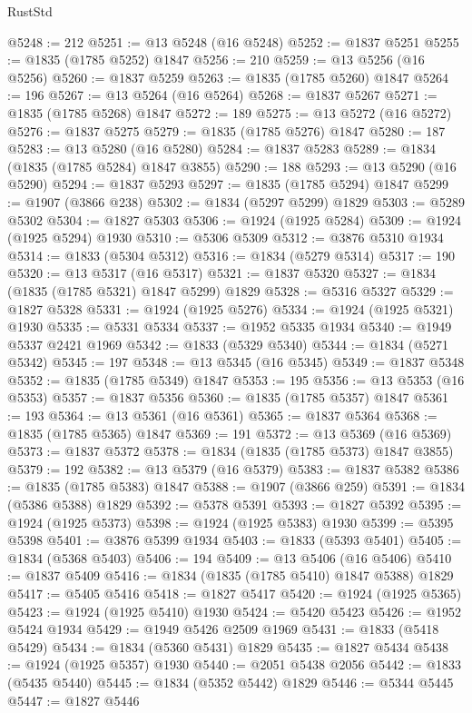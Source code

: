 \begin{lexlean}{RustStd}
\begin{coremodule}
@5248 := 212
@5251 := @13 @5248 (@16 @5248)
@5252 := @1837 @5251
@5255 := @1835 (@1785 @5252) @1847
@5256 := 210
@5259 := @13 @5256 (@16 @5256)
@5260 := @1837 @5259
@5263 := @1835 (@1785 @5260) @1847
@5264 := 196
@5267 := @13 @5264 (@16 @5264)
@5268 := @1837 @5267
@5271 := @1835 (@1785 @5268) @1847
@5272 := 189
@5275 := @13 @5272 (@16 @5272)
@5276 := @1837 @5275
@5279 := @1835 (@1785 @5276) @1847
@5280 := 187
@5283 := @13 @5280 (@16 @5280)
@5284 := @1837 @5283
@5289 := @1834 (@1835 (@1785 @5284) @1847 @3855)
@5290 := 188
@5293 := @13 @5290 (@16 @5290)
@5294 := @1837 @5293
@5297 := @1835 (@1785 @5294) @1847
@5299 := @1907 (@3866 @238)
@5302 := @1834 (@5297 @5299) @1829
@5303 := @5289 @5302
@5304 := @1827 @5303
@5306 := @1924 (@1925 @5284)
@5309 := @1924 (@1925 @5294) @1930
@5310 := @5306 @5309
@5312 := @3876 @5310 @1934
@5314 := @1833 (@5304 @5312)
@5316 := @1834 (@5279 @5314)
@5317 := 190
@5320 := @13 @5317 (@16 @5317)
@5321 := @1837 @5320
@5327 := @1834 (@1835 (@1785 @5321) @1847 @5299) @1829
@5328 := @5316 @5327
@5329 := @1827 @5328
@5331 := @1924 (@1925 @5276)
@5334 := @1924 (@1925 @5321) @1930
@5335 := @5331 @5334
@5337 := @1952 @5335 @1934
@5340 := @1949 @5337 @2421 @1969
@5342 := @1833 (@5329 @5340)
@5344 := @1834 (@5271 @5342)
@5345 := 197
@5348 := @13 @5345 (@16 @5345)
@5349 := @1837 @5348
@5352 := @1835 (@1785 @5349) @1847
@5353 := 195
@5356 := @13 @5353 (@16 @5353)
@5357 := @1837 @5356
@5360 := @1835 (@1785 @5357) @1847
@5361 := 193
@5364 := @13 @5361 (@16 @5361)
@5365 := @1837 @5364
@5368 := @1835 (@1785 @5365) @1847
@5369 := 191
@5372 := @13 @5369 (@16 @5369)
@5373 := @1837 @5372
@5378 := @1834 (@1835 (@1785 @5373) @1847 @3855)
@5379 := 192
@5382 := @13 @5379 (@16 @5379)
@5383 := @1837 @5382
@5386 := @1835 (@1785 @5383) @1847
@5388 := @1907 (@3866 @259)
@5391 := @1834 (@5386 @5388) @1829
@5392 := @5378 @5391
@5393 := @1827 @5392
@5395 := @1924 (@1925 @5373)
@5398 := @1924 (@1925 @5383) @1930
@5399 := @5395 @5398
@5401 := @3876 @5399 @1934
@5403 := @1833 (@5393 @5401)
@5405 := @1834 (@5368 @5403)
@5406 := 194
@5409 := @13 @5406 (@16 @5406)
@5410 := @1837 @5409
@5416 := @1834 (@1835 (@1785 @5410) @1847 @5388) @1829
@5417 := @5405 @5416
@5418 := @1827 @5417
@5420 := @1924 (@1925 @5365)
@5423 := @1924 (@1925 @5410) @1930
@5424 := @5420 @5423
@5426 := @1952 @5424 @1934
@5429 := @1949 @5426 @2509 @1969
@5431 := @1833 (@5418 @5429)
@5434 := @1834 (@5360 @5431) @1829
@5435 := @1827 @5434
@5438 := @1924 (@1925 @5357) @1930
@5440 := @2051 @5438 @2056
@5442 := @1833 (@5435 @5440)
@5445 := @1834 (@5352 @5442) @1829
@5446 := @5344 @5445
@5447 := @1827 @5446

\end{coremodule}
\end{lexlean}
